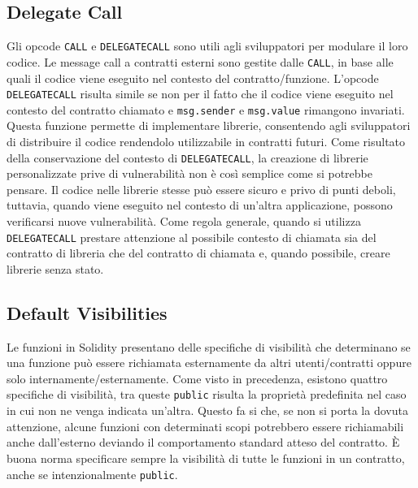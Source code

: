\subsection*{Delegate Call}
Gli opcode \lstinline|CALL| e \lstinline|DELEGATECALL| sono utili agli sviluppatori per modulare il loro codice. Le message call a contratti esterni sono gestite dalle \lstinline|CALL|, in base alle quali il codice viene eseguito nel contesto del contratto/funzione. L'opcode \lstinline|DELEGATECALL| risulta simile se non per il fatto che il codice viene eseguito nel contesto del contratto chiamato e \lstinline|msg.sender| e \lstinline|msg.value| rimangono invariati. Questa funzione permette di implementare librerie, consentendo agli sviluppatori di distribuire il codice rendendolo utilizzabile in contratti futuri. Come risultato della conservazione del contesto di \lstinline|DELEGATECALL|, la creazione di librerie personalizzate prive di vulnerabilità non è così semplice come si potrebbe pensare. Il codice nelle librerie stesse può essere sicuro e privo di punti deboli, tuttavia, quando viene eseguito nel contesto di un'altra applicazione, possono verificarsi nuove vulnerabilità. Come regola generale, quando si utilizza \lstinline|DELEGATECALL| prestare attenzione al possibile contesto di chiamata sia del contratto di libreria che del contratto di chiamata e, quando possibile, creare librerie senza stato.

\subsection*{Default Visibilities}
Le funzioni in Solidity presentano delle specifiche di visibilità che determinano se una funzione può essere richiamata esternamente da altri utenti/contratti oppure solo internamente/esternamente. Come visto in precedenza, esistono quattro specifiche di visibilità, tra queste \lstinline|public| risulta la proprietà predefinita nel caso in cui non ne venga indicata un'altra. Questo fa si che, se non si porta la dovuta attenzione, alcune funzioni con determinati scopi potrebbero essere richiamabili anche dall'esterno deviando il comportamento standard atteso del contratto. È buona norma specificare sempre la visibilità di tutte le funzioni in un contratto, anche se intenzionalmente \lstinline|public|.

